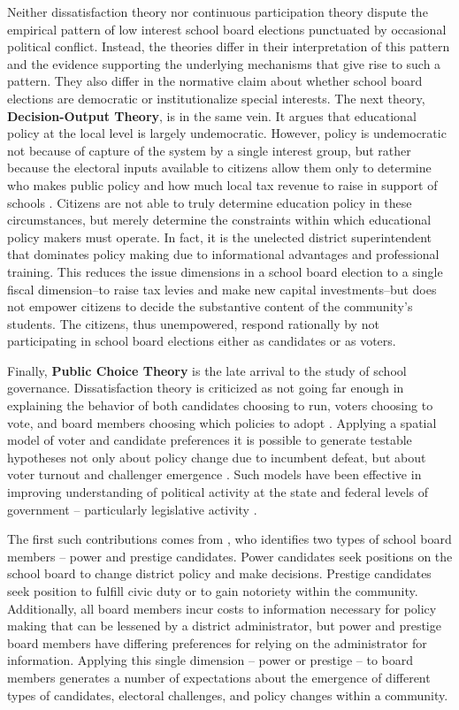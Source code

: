 Neither dissatisfaction theory nor continuous participation theory dispute the 
empirical pattern of low interest school board elections punctuated by occasional 
political conflict. Instead, the theories differ in their interpretation of this 
pattern and the evidence supporting the underlying mechanisms that give rise to 
such a pattern. They also differ in the normative claim about whether school board 
elections are democratic or institutionalize special interests. The next theory, 
\textbf{Decision-Output Theory}, is in the same vein. It argues that educational 
policy at the local level is largely undemocratic. However, policy is undemocratic 
not because of capture of the system by a single interest group, but rather because 
the electoral inputs available to citizens allow them only to determine who makes 
public policy and how much local tax revenue to raise in support of schools 
\citep{RefWorks:283}. Citizens are not able to truly determine education policy 
in these circumstances, but merely determine the constraints within which educational 
policy  makers must operate. In fact, it is the unelected district superintendent 
that dominates policy making due to informational advantages and professional 
training. This reduces the issue dimensions in a school board election to a single 
fiscal dimension--to raise tax levies and  make new capital investments--but does 
not empower citizens to decide the substantive content of the community's students. 
The citizens, thus unempowered, respond rationally by not participating in school 
board elections either as candidates or as voters. 

Finally, \textbf{Public Choice Theory} is the late arrival to the study of school 
governance. Dissatisfaction theory is criticized as not going far enough in 
explaining the behavior of both candidates choosing to run, voters choosing to 
vote, and board members choosing which policies to adopt 
\citep{RefWorks:336,RefWorks:340,RefWorks:339}. Applying a spatial model of voter 
and candidate preferences it is possible to generate testable hypotheses not only 
about policy change due to incumbent defeat, but about voter turnout and challenger 
emergence \citep{RefWorks:243}. Such models have been effective in improving 
understanding of political activity at the state and federal levels of government 
-- particularly legislative activity \citep{RefWorks:350,RefWorks:349,RefWorks:352}. 


The first such contributions comes from \citet{RefWorks:336}, who
identifies two types of school board members -- power and prestige candidates. Power 
candidates seek positions on the school board to change district policy and make 
decisions. Prestige candidates seek position to fulfill civic duty or to gain 
notoriety within the community. Additionally, all board members incur costs to 
information necessary for policy making that can be lessened by a district 
administrator, but power and prestige board members have differing preferences 
for relying on the administrator for information. Applying this single dimension 
-- power or prestige -- to board members generates a number of expectations 
about the emergence of different types of candidates, electoral challenges, and 
policy changes within a community. 

